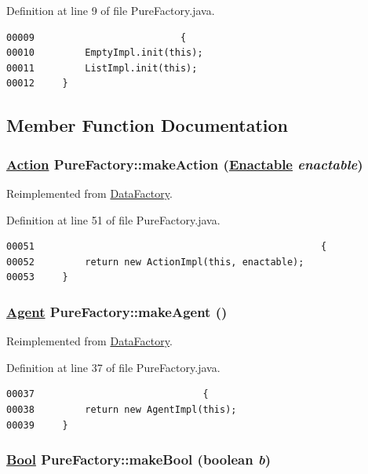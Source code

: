 Definition at line 9 of file Pure\-Factory.java.\footnotesize\begin{verbatim}00009                          {
00010         EmptyImpl.init(this);
00011         ListImpl.init(this);
00012     }
\end{verbatim}\normalsize 


\subsection{Member Function Documentation}
\hypertarget{classPureFactory_a12}{
\subsubsection[makeAction]{\setlength{\rightskip}{0pt plus 5cm}\hyperlink{interfaceAction}{Action} Pure\-Factory::make\-Action (\hyperlink{interfaceEnactable}{Enactable} {\em enactable})}}
\label{classPureFactory_a12}




Reimplemented from \hyperlink{interfaceDataFactory_a8}{Data\-Factory}.

Definition at line 51 of file Pure\-Factory.java.\footnotesize\begin{verbatim}00051                                                   {
00052         return new ActionImpl(this, enactable);
00053     }
\end{verbatim}\normalsize 
\hypertarget{classPureFactory_a8}{
\subsubsection[makeAgent]{\setlength{\rightskip}{0pt plus 5cm}\hyperlink{interfaceAgent}{Agent} Pure\-Factory::make\-Agent ()}}
\label{classPureFactory_a8}




Reimplemented from \hyperlink{interfaceDataFactory_a10}{Data\-Factory}.

Definition at line 37 of file Pure\-Factory.java.\footnotesize\begin{verbatim}00037                              {
00038         return new AgentImpl(this);
00039     }
\end{verbatim}\normalsize 
\hypertarget{classPureFactory_a3}{
\subsubsection[makeBool]{\setlength{\rightskip}{0pt plus 5cm}\hyperlink{interfaceBool}{Bool} Pure\-Factory::make\-Bool (boolean {\em b})}}
\label{classPureFactory_a3}




